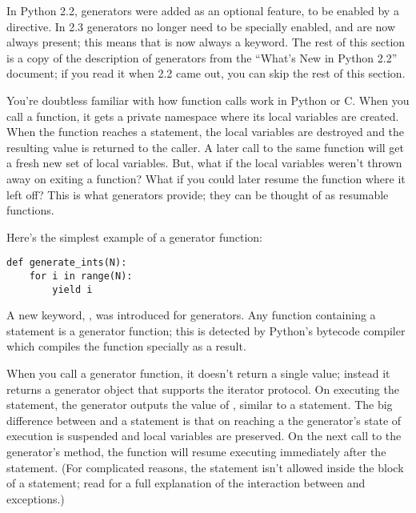 \documentclass{howto}
\begin{document}
In Python 2.2, generators were added as an optional feature, to be
enabled by a  directive.  In
2.3 generators no longer need to be specially enabled, and are now
always present; this means that  is now always a
keyword.  The rest of this section is a copy of the description of
generators from the ``What's New in Python 2.2'' document; if you read
it when 2.2 came out, you can skip the rest of this section.

You're doubtless familiar with how function calls work in Python or C.
When you call a function, it gets a private namespace where its local
variables are created.  When the function reaches a 
statement, the local variables are destroyed and the resulting value
is returned to the caller.  A later call to the same function will get
a fresh new set of local variables. But, what if the local variables
weren't thrown away on exiting a function?  What if you could later
resume the function where it left off?  This is what generators
provide; they can be thought of as resumable functions.

Here's the simplest example of a generator function:

\begin{verbatim}
def generate_ints(N):
    for i in range(N):
        yield i
\end{verbatim}

A new keyword, , was introduced for generators.  Any
function containing a  statement is a generator
function; this is detected by Python's bytecode compiler which
compiles the function specially as a result.  

When you call a generator function, it doesn't return a single value;
instead it returns a generator object that supports the iterator
protocol.  On executing the  statement, the generator
outputs the value of , similar to a 
statement.  The big difference between  and a
 statement is that on reaching a  the
generator's state of execution is suspended and local variables are
preserved.  On the next call to the generator's  method,
the function will resume executing immediately after the
 statement.  (For complicated reasons, the
 statement isn't allowed inside the  block
of a  statement; read  for a full
explanation of the interaction between  and
exceptions.)
\end{document}

